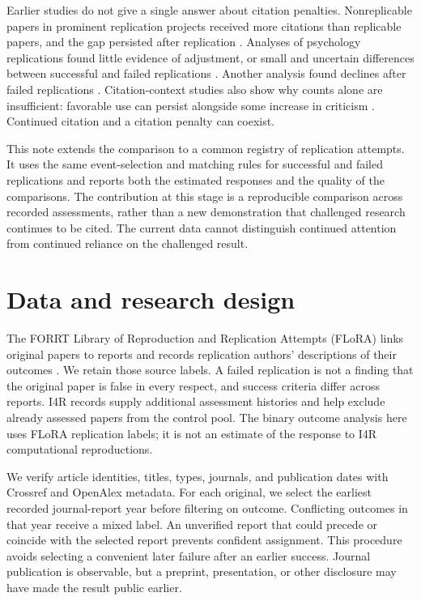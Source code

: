 \documentclass[11pt,letterpaper]{article}
\begin{document}
Earlier studies do not give a single answer about citation penalties. Nonreplicable papers in prominent replication projects received more citations than replicable papers, and the gap persisted after replication \citep{serra2021}. Analyses of psychology replications found little evidence of adjustment, or small and uncertain differences between successful and failed replications \citep{schafmeister2021,vonhippel2022}. Another analysis found declines after failed replications \citep{clark2023}. Citation-context studies also show why counts alone are insufficient: favorable use can persist alongside some increase in criticism \citep{hardwicke2021}. Continued citation and a citation penalty can coexist.

This note extends the comparison to a common registry of replication attempts. It uses the same event-selection and matching rules for successful and failed replications and reports both the estimated responses and the quality of the comparisons. The contribution at this stage is a reproducible comparison across recorded assessments, rather than a new demonstration that challenged research continues to be cited. The current data cannot distinguish continued attention from continued reliance on the challenged result.

\section{Data and research design}
The FORRT Library of Reproduction and Replication Attempts (FLoRA) links original papers to reports and records replication authors' descriptions of their outcomes \citep{flora2026}. We retain those source labels. A failed replication is not a finding that the original paper is false in every respect, and success criteria differ across reports. I4R records supply additional assessment histories and help exclude already assessed papers from the control pool. The binary outcome analysis here uses FLoRA replication labels; it is not an estimate of the response to I4R computational reproductions.

We verify article identities, titles, types, journals, and publication dates with Crossref and OpenAlex metadata. For each original, we select the earliest recorded journal-report year before filtering on outcome. Conflicting outcomes in that year receive a mixed label. An unverified report that could precede or coincide with the selected report prevents confident assignment. This procedure avoids selecting a convenient later failure after an earlier success. Journal publication is observable, but a preprint, presentation, or other disclosure may have made the result public earlier.
\end{document}
